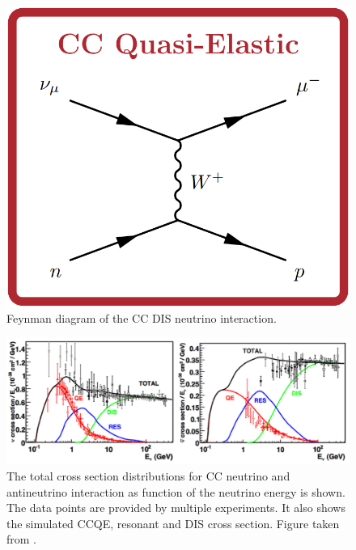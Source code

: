 \begin{itemize}
        \begin{figure}[!htb]
        \centering
        \includegraphics[scale=0.25]{Figures/Chapter1/CCQEChannel.png}
        \caption{Feynman diagram of the CC DIS neutrino interaction.}
        \label{fig:Int:NuInteractions:CCDISFeynman}
    \end{figure}
\end{itemize}

\begin{figure}[!htb]
    \centering
    \includegraphics[scale=0.35]{Figures/Chapter1/InteractionChannels.png}
    \caption{The total cross section distributions for CC neutrino and antineutrino interaction as function of the neutrino energy is shown. The data points are provided by multiple experiments. It also shows the simulated CCQE, resonant and DIS cross section. Figure taken from \cite{Formaggio_2012}.}
    \label{fig:Int:NuInteractions:CCXSecChannels}
\end{figure}


